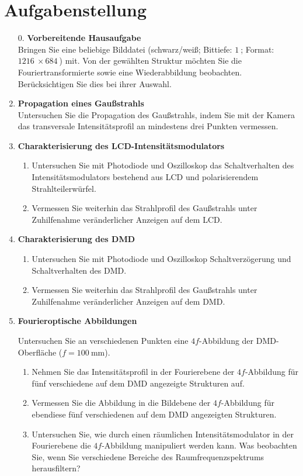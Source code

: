 \documentclass[
class=book,
accentcolor=1b,
custommargins=geometry,
fontsize=11pt,
thesis={type=Versuchsanleitung},
ruledheaders=all,
headline=false,
instbox=false,
marginpar=false,
title=small,
ignore-missing-data=true,
twoside=false,
pdfa=false %
]{apqpub}
\begin{document}
	\chapter{Aufgabenstellung}
	\begin{enumerate}
	\item[0.]
	\textbf{Vorbereitende Hausaufgabe} \\
	Bringen Sie eine beliebige Bilddatei (schwarz/weiß; Bittiefe: $\SI{1}{}$; Format: $\SI{1216}{} \times \SI{684}{}$) mit.
	Von der gewählten Struktur möchten Sie die Fouriertransformierte sowie eine Wiederabbildung beobachten. 
	Berücksichtigen Sie dies bei ihrer Auswahl. 
	\item
	\textbf{Propagation eines Gaußstrahls} \\
Untersuchen Sie die Propagation des Gaußstrahls, indem Sie  mit der Kamera das transversale Intensitätsprofil an mindestens drei Punkten vermessen.
\item \textbf{Charakterisierung des LCD-Intensitätsmodulators}
\begin{enumerate}
\item Untersuchen Sie mit Photodiode und Oszilloskop das Schaltverhalten des Intensitätsmodulators bestehend aus LCD und polarisierendem Strahlteilerwürfel.
\item Vermessen Sie weiterhin das Strahlprofil des Gaußstrahls unter Zuhilfenahme veränderlicher Anzeigen auf dem LCD.
\end{enumerate}

\item
\textbf{Charakterisierung des DMD}
\begin{enumerate}
\item Untersuchen Sie mit Photodiode und Oszilloskop Schaltverzögerung und Schaltverhalten des DMD.
\item Vermessen Sie weiterhin das Strahlprofil des Gaußstrahls unter Zuhilfenahme veränderlicher Anzeigen auf dem DMD.
\end{enumerate}

\item
\textbf{Fourieroptische Abbildungen}

Untersuchen Sie an verschiedenen Punkten eine $4f$-Abbildung der DMD-Oberfläche ($f = \SI{100}{\milli \metre}$).
\begin{enumerate}
\item Nehmen Sie das Intensitätsprofil in der Fourierebene der $4f$-Abbildung für fünf verschiedene auf dem DMD angezeigte Strukturen auf.
\item Vermessen Sie die Abbildung in die Bildebene der $4f$-Abbildung für ebendiese fünf verschiedenen auf dem DMD angezeigten Strukturen.
\item Untersuchen Sie, wie durch einen räumlichen Intensitätsmodulator in der Fourierebene die $4f$-Abbildung manipuliert werden kann.
Was beobachten Sie, wenn Sie verschiedene Bereiche des Raumfrequenzspektrums herausfiltern?
\end{enumerate}
	\end{enumerate}
\end{document}
